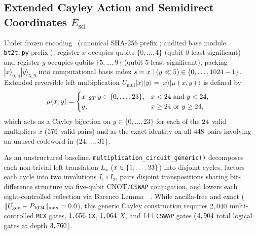 \documentclass[aps,prx,twocolumn,superscriptaddress,nofootinbib]{revtex4-2}
\begin{document}
\subsection{Extended Cayley Action and Semidirect Coordinates $E_{\mathrm{sd}}$}
Under frozen encoding \btmEncVer\ (canonical SHA-256 prefix \btmEncSha; audited base module \texttt{bt2t.py} prefix \btmBaseBtPySha), register $x$ occupies qubits $\{0,\dots,4\}$ (qubit $0$ least significant) and register $y$ occupies qubits $\{5,\dots,9\}$ (qubit $5$ least significant), packing $|x\rangle_{0..4}|y\rangle_{5..9}$ into computational basis index $s = x \mid (y \ll 5) \in \{0,\dots,1024 - 1\}$. Extended reversible left multiplication $U_{\mathrm{mul}}|x\rangle|y\rangle = |x\rangle|\mu(x,y)\rangle$ is defined by
\begin{equation}
  \mu(x,y) = \begin{cases}
    x \cdot_{2T} y \in \{0,\dots,23\}, & x < 24 \text{ and } y < 24, \\
    y, & x \ge 24 \text{ or } y \ge 24,
  \end{cases}
  \label{eq:extended_mul}
\end{equation}
which acts as a Cayley bijection on $y \in \{0,\dots,23\}$ for each of the $24$ valid multipliers $x$ ($576$ valid pairs) and as the exact identity on all $448$ pairs involving an unused codeword in $\{24,\dots,31\}$.

As an unstructured baseline, \texttt{multiplication\_circuit\_generic()} decomposes each non-trivial left translation $L_x$ ($x \in \{1,\dots,23\}$) into disjoint cycles, factors each cycle into two involutions $I_1 \circ I_2$, pairs disjoint transpositions sharing bit-difference structure via five-qubit CNOT/\texttt{CSWAP} conjugation, and lowers each eight-controlled reflection via Barenco Lemma~\btmBarencoLemmaSevenThree~\cite{Barenco1995}. While ancilla-free and exact ($\|U_{\mathrm{gen}} - P_{1024}\|_{\max} = 0.0$), this generic Cayley construction requires $2,040$ multi-controlled \texttt{MCX} gates, $1,656$ \texttt{CX}, $1,064$ $X$, and $144$ \texttt{CSWAP} gates ($4,904$ total logical gates at depth $3,760$).
\end{document}
